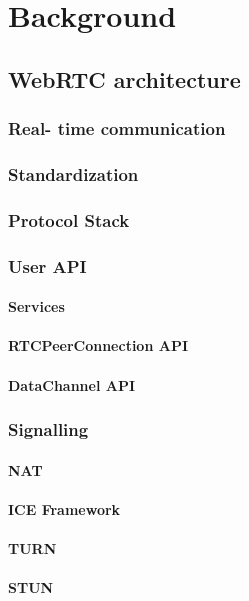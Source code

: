 \documentclass[UKenglish]{ifimaster}
\begin{document}
\chapter{Background}

\section{WebRTC architecture}
\subsection{Real- time communication}
\subsection{Standardization}
\subsection{Protocol Stack}
\subsection{User API}
\subsubsection{Services}
\subsubsection{RTCPeerConnection API}
\subsubsection{DataChannel API}
\subsection{Signalling}
\subsubsection{NAT}
\subsubsection{ICE Framework}
\subsubsection{TURN}
\subsubsection{STUN}
\end{document}
